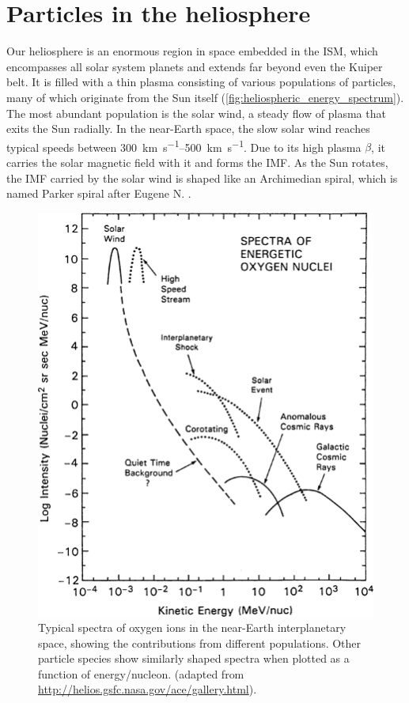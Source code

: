 \section{Particles in the heliosphere}

Our heliosphere is an enormous region in space embedded in the \ac{ISM}, which encompasses all solar system planets and extends far beyond even the Kuiper belt. 
It is filled with a thin plasma consisting of various populations of particles, many of which originate from the Sun itself (\autoref{fig:heliospheric_energy_spectrum}). 
The most abundant population is the solar wind, a steady flow of plasma that exits the Sun radially. 
In the near-Earth space, the slow solar wind reaches typical speeds between \SIrange[range-phrase={\,and\,}]{300}{500}{\kilo\meter\per\second}.
Due to its high plasma $\beta$, it carries the solar magnetic field with it and forms the \ac{IMF}.
As the Sun rotates, the \ac{IMF} carried by the solar wind is shaped like an Archimedian spiral, which is named Parker spiral after Eugene N. \citet{Parker-1958}.

\begin{figure}
    \centering
    \includegraphics[width=0.6\linewidth]{images/heliospheric_energy_spectrum}
    \caption[Spectra of oxygen ions in the near-Earth interplanetary space]{Typical spectra of oxygen ions in the near-Earth interplanetary space, showing the contributions from different populations. Other particle species show similarly shaped spectra when plotted as a function of energy/nucleon. (adapted from \url{http://helios.gsfc.nasa.gov/ace/gallery.html}).}
    \label{fig:heliospheric_energy_spectrum}
\end{figure}

